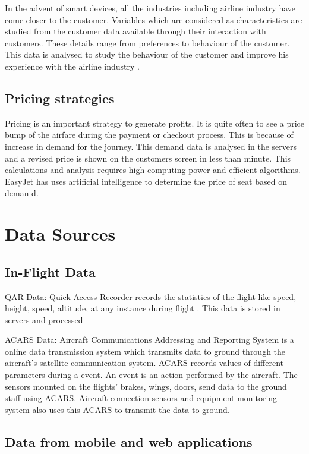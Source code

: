 \documentclass[sigconf]{acmart}
\begin{document}
In the advent of smart devices, all the industries including airline industry have come closer to the customer. Variables which are considered as characteristics are studied from the customer data available through their interaction with customers. These details range from preferences to behaviour of the customer. This data is analysed to study the behaviour of the customer and improve his experience with the airline industry \cite{EXASTAX2017}. 

\subsection{Pricing strategies}

Pricing is an important strategy to generate profits. It is quite often to see a price bump of the airfare during the payment or checkout process. This is because of increase in demand for the journey. This demand data is analysed in the servers and a revised price is shown on the customers screen in less than minute. This calculations and analysis requires high computing power and efficient algorithms. EasyJet has uses  artificial intelligence to determine the price of seat based on deman d\cite{EXASTAX2017}. 


\section{Data Sources}

\subsection{In-Flight Data}

QAR Data: Quick Access Recorder records the statistics of the flight like speed, height, speed, altitude, at any instance during flight \cite{7015483}. This data is stored in servers and processed 

ACARS Data: Aircraft Communications Addressing and Reporting System is a online data transmission system which transmits data to ground through the aircraft’s satellite communication system\cite{Wikipedia}. ACARS records values of different parameters during a event. An event is an action performed by the aircraft. The sensors mounted on the flights’ brakes, wings, doors, send data to the ground staff using ACARS. Aircraft connection sensors and equipment monitoring system also uses this ACARS to transmit the data to ground.

\subsection{Data from mobile and web applications}
\end{document}
